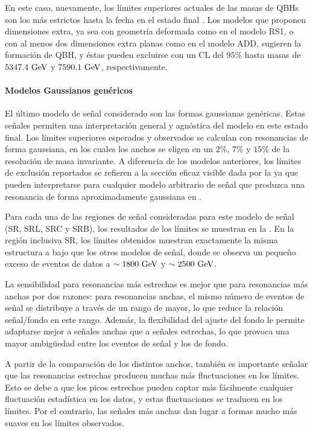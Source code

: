 En este caso, nuevamente, los límites superiores actuales de las masas de \acp{QBH} son los más estrictos hasta la fecha en el estado final \gammajet. Los modelos que proponen dimensiones extra, ya sea con geometría deformada como en el modelo RS1, o con al menos dos dimensiones extra planas como en el modelo ADD, sugieren la formación de \ac{QBH}, y éstas pueden excluirse con un \ac{CL} del \(95\%\) hasta masas de \(5347.4~\text{GeV}\) y \(7590.1~\text{GeV}\), respectivamente.




\paragraph{Modelos Gaussianos genéricos}
\label{paragraph:results:results:bkgsig:results:gaus}


El último modelo de señal considerado son las formas gaussianas genéricas. Estas señales permiten una interpretación general y agnóstica del modelo en este estado final. Los límites superiores esperados y observados se calculan con resonancias de forma gaussiana, en los cuales los anchos se eligen en un \(2\%\), \(7\%\) y \(15\%\) de la resolución de masa invariante. A diferencia de los modelos anteriores, los límites de exclusión reportados se refieren a la sección eficaz visible dada por la \Eqn{\ref{eq:results:results:bkgsig:results:visible_xs}} ya que pueden interpretarse para cualquier modelo arbitrario de señal que produzca una resonancia \gammajet de forma aproximadamente gaussiana en \myj.

Para cada una de las regiones de señal consideradas para este modelo de señal (SR, SRL, SRC y SRB), los resultados de los límites se muestran en la \Fig{\ref{fig:results:results:bkgsig:results:gaus:limits}}.
En la región inclusiva SR, los límites obtenidos muestran exactamente la misma estructura a bajo \myj que los otros modelos de señal, donde se observa un pequeño exceso de eventos de datos a \(\sim 1800~\text{GeV}\) y \(\sim 2500~\text{GeV}\).

La sensibilidad para resonancias más estrechas es mejor que para resonancias más anchas por dos razones: para resonancias anchas, el mismo número de eventos de señal se distribuye a través de un rango de \myj mayor, lo que reduce la relación señal/fondo en este rango. Además, la flexibilidad del ajuste del fondo le permite adaptarse mejor a señales anchas que a señales estrechas, lo que provoca una mayor ambigüedad entre los eventos de señal y los de fondo.

A partir de la comparación de los distintos anchos, también es importante señalar que las resonancias estrechas producen muchas más fluctuaciones en los límites. Esto se debe a que los picos estrechos pueden captar más fácilmente cualquier fluctuación estadística en los datos, y estas fluctuaciones se traducen en los límites. Por el contrario, las señales más anchas dan lugar a formas mucho más suaves en los límites observados.

